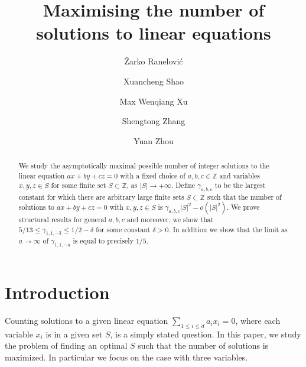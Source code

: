 \documentclass[12pt, notitlepage]{amsart}
\numberwithin{equation}{section}
\theoremstyle{remark}
\theoremstyle{definition}
\theoremstyle{remark}
\numberwithin{equation}{section}
\begin{document}
\title{Maximising the number of solutions to linear equations}
\author[Ran\dj elovi\'c]{\v{Z}arko Ran\dj elovi\'c}
\address{Mathematical Institute of the Serbian Academy of Sciences and Arts
Kneza Mihaila 36
Belgrade 11000, Serbia}

\author[Shao]{Xuancheng Shao} 
\address{Department of Mathematics, University of Kentucky, Lexington, KY 40506, USA}

\author[Xu]{Max Wenqiang Xu}
\address{Yau Mathematical Sciences Center, Tsinghua University, Beijing, 100084, China}
\address{Beijing Institute of Mathematical Sciences and Applications, Beijing, 101408, China}

\author[Zhang]{Shengtong Zhang}
\address{Department of Mathematics, Stanford University, Stanford, CA.}

\author[Zhou]{Yuan Zhou}
\address{Department of Mathematics, University of Kentucky, Lexington, KY 40506, USA}

\begin{abstract}
    We study the asymptotically maximal possible number of integer solutions to the linear equation $ax+by+cz = 0$ with a fixed choice of $a, b, c \in \mathbb{Z}$ and variables $x, y, z \in S$ for some finite set $S\subset \mathbb{Z}$, as $|S|\to +\infty$. Define $\gamma_{a, b, c}$ to be the largest constant for which there are arbitrary large finite sets $S\subset \mathbb{Z}$ such that the number of solutions to $ax+by+cz=0$ with $x,y,z\in S$ is $\gamma_{a,b,c}|S|^2-o(|S|^2)$. We prove structural results for general $a, b, c$ and moreover, we show that $5/13\le \gamma_{1,1,-3}\le 1/2-\delta$ for some constant $\delta>0$. In addition we show that the limit as $a \rightarrow \infty$ of $\gamma_{1,1,-a}$ is equal to precisely $1/5$. 
    
\end{abstract}

\maketitle
\section{Introduction}
Counting solutions to a given linear equation $\sum_{1\le i \le d} a_i x_i = 0$, where each variable $x_i$ is in a given set $S$, is a simply stated question. In this paper, we study the problem of finding an optimal $S$ such that the number of solutions is maximized. In particular we focus on the case with three variables.  
\end{document}
